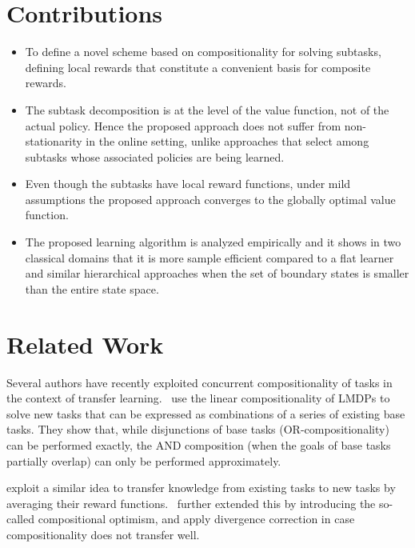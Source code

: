 \section{Contributions}
\begin{itemize}
\item To define a novel scheme based on compositionality for solving subtasks, defining local rewards that constitute a convenient basis for composite rewards.
\item The subtask decomposition is at the level of the value function, not of the actual policy. Hence the proposed approach does not suffer from non-stationarity in the online setting, unlike approaches that select among subtasks whose associated policies are being learned.
\item Even though the subtasks have local reward functions, under mild assumptions the proposed approach converges to the globally optimal value function.
\item The proposed learning algorithm is analyzed empirically and it shows in two classical domains 
that it is more sample efficient compared to a flat learner and similar hierarchical approaches when the set of boundary states is smaller than the entire state space.
\end{itemize}


\section{Related Work}
Several authors have recently exploited concurrent compositionality of tasks in the context of transfer learning.~\citet{Niekerk2019} use the linear compositionality of LMDPs to solve new tasks that can be expressed as combinations of a series of existing base tasks. They show that, while disjunctions of base tasks (OR-compositionality) can be performed exactly, the AND composition (when the goals of base tasks partially overlap) can only be performed approximately.

\citep{Haarnoja2018a} exploit a similar idea to transfer knowledge from existing tasks to new tasks by averaging their reward functions.~\citep{Hunt2019} further extended this by introducing the so-called compositional optimism, and apply divergence correction in case compositionality does not transfer well.

